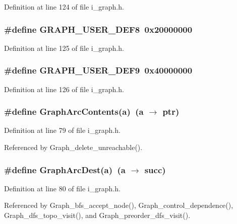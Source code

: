 Definition at line 124 of file i\_\-graph.h.
\subsubsection{\setlength{\rightskip}{0pt plus 5cm}\#define GRAPH\_\-USER\_\-DEF8~0x20000000}\label{i__graph_8h_508e79ed33bdedba88903f5d7f2a8672}




Definition at line 125 of file i\_\-graph.h.
\subsubsection{\setlength{\rightskip}{0pt plus 5cm}\#define GRAPH\_\-USER\_\-DEF9~0x40000000}\label{i__graph_8h_100285cf4daadb6d18a45bec8a44e061}




Definition at line 126 of file i\_\-graph.h.
\subsubsection{\setlength{\rightskip}{0pt plus 5cm}\#define Graph\-Arc\-Contents(a)~(a $\rightarrow$ ptr)}\label{i__graph_8h_82666d3eef0971eba3e87a02c02eed6b}




Definition at line 79 of file i\_\-graph.h.

Referenced by Graph\_\-delete\_\-unreachable().
\subsubsection{\setlength{\rightskip}{0pt plus 5cm}\#define Graph\-Arc\-Dest(a)~(a $\rightarrow$ succ)}\label{i__graph_8h_a5902dc718aecaefed9dd8625dc22469}




Definition at line 80 of file i\_\-graph.h.

Referenced by Graph\_\-bfs\_\-accept\_\-node(), Graph\_\-control\_\-dependence(), Graph\_\-dfs\_\-topo\_\-visit(), and Graph\_\-preorder\_\-dfs\_\-visit().
